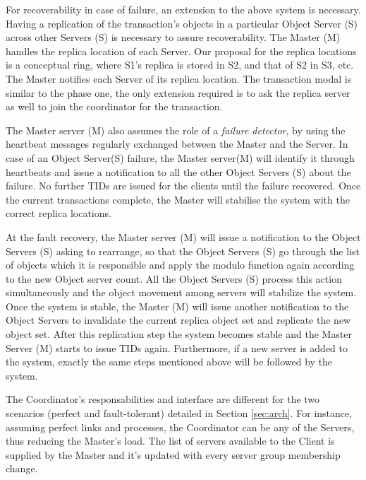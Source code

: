 \documentclass[times, 10pt,twocolumn]{article}
\begin{document}
\label{subsec:ftsys}
For recoverability in case of failure, an extension to the above system is necessary. Having a replication of the transaction's objects in a particular Object Server (S) across other Servers (S) is necessary to assure recoverability. The Master (M) handles the replica location of each Server. Our proposal for the replica locations is a conceptual ring, where S1's replica is stored in S2, and that of S2 in S3, etc. The Master notifies each Server of its replica location. The transaction modal is similar to the phase one, the only extension required is to ask the replica server as well to join the coordinator for the transaction.

The Master server (M) also assumes the role of a {\it failure detector}, by using the heartbeat messages regularly exchanged between the Master and the Server. In case of an Object Server(S) failure, the Master server(M) will identify it through heartbeats and issue a notification to all the other Object Servers (S) about the failure. No further TIDs are issued for the clients until the failure recovered. Once the current transactions complete, the Master will stabilise the system with the correct replica locations.

At the fault recovery, the Master server (M) will issue a notification to the Object Servers (S) asking to rearrange, so that the Object Servers (S) go through the list of objects which it is responsible and apply the modulo function again according to the new Object server count. All the Object Servers (S) process this action simultaneously and the object movement among servers will stabilize the system. Once the system is stable, the Master (M) will issue another notification to the Object Servers to invalidate the current replica object set and replicate the new object set. After this replication step the system becomes stable and the Master Server (M) starts to issue TIDs again. Furthermore, if a new server is added to the system, exactly the same steps mentioned above will be followed by the system.

\label{subsec:respon}

The Coordinator's responsabilities and interface are different for the two scenarios (perfect and fault-tolerant) detailed in Section \ref{sec:arch}. For instance, assuming perfect links and processes, the Coordinator can be any of the Servers, thus reducing the Master's load. The list of servers available to the Client is supplied by the Master and it's updated with every server group membership change.
\end{document}
